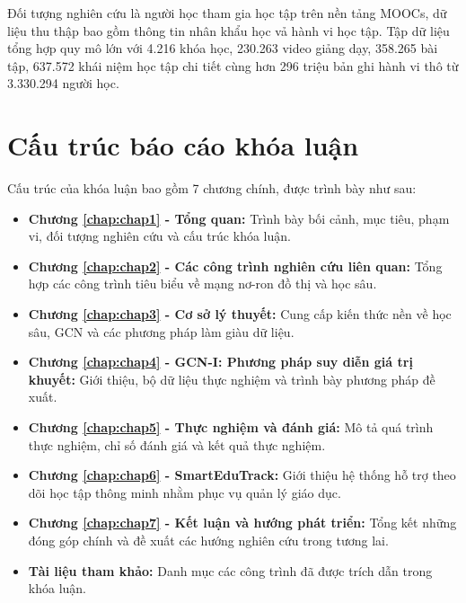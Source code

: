 Đối tượng nghiên cứu là người học tham gia học tập trên nền tảng MOOCs, dữ liệu thu thập bao gồm thông tin nhân khẩu học vả hành vi học tập. Tập dữ liệu tổng hợp quy mô lớn với 4.216 khóa học, 230.263 video giảng dạy, 358.265 bài tập, 637.572 khái niệm học tập chi tiết cùng hơn 296 triệu bản ghi hành vi thô từ 3.330.294 người học.

\section{Cấu trúc báo cáo khóa luận}
Cấu trúc của khóa luận bao gồm 7 chương chính, được trình bày như sau:

\begin{itemize}
\item \textbf{Chương \ref{chap:chap1} - Tổng quan:} Trình bày bối cảnh, mục tiêu, phạm vi, đối tượng nghiên cứu và cấu trúc khóa luận.
\item \textbf{Chương \ref{chap:chap2} - Các công trình nghiên cứu liên quan:} Tổng hợp các công trình tiêu biểu về mạng nơ-ron đồ thị và học sâu.
 \item \textbf{Chương \ref{chap:chap3} - Cơ sở lý thuyết:} Cung cấp kiến thức nền về học sâu, GCN và các phương pháp làm giàu dữ liệu.
\item \textbf{Chương \ref{chap:chap4} - GCN-I: Phương pháp suy diễn giá trị khuyết:} Giới thiệu, bộ dữ liệu thực nghiệm và trình bày phương pháp đề xuất.
\item \textbf{Chương \ref{chap:chap5} - Thực nghiệm và đánh giá:} Mô tả quá trình thực nghiệm, chỉ số đánh giá và kết quả thực nghiệm.
\item \textbf{Chương \ref{chap:chap6} - SmartEduTrack:} Giới thiệu hệ thống hỗ trợ theo dõi học tập thông minh nhằm phục vụ quản lý giáo dục.
\item \textbf{Chương \ref{chap:chap7} - Kết luận và hướng phát triển:} Tổng kết những đóng góp chính và đề xuất các hướng nghiên cứu trong tương lai.
 \item \textbf{Tài liệu tham khảo:} Danh mục các công trình đã được trích dẫn trong khóa luận.
\end{itemize}
 
 
